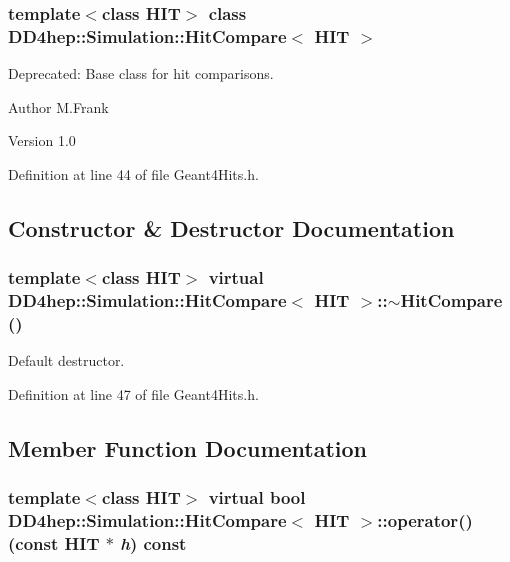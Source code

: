 \subsubsection*{template$<$class HIT$>$ class DD4hep::Simulation::HitCompare$<$ HIT $>$}

Deprecated: Base class for hit comparisons. \begin{DoxyAuthor}{Author}
M.Frank 
\end{DoxyAuthor}
\begin{DoxyVersion}{Version}
1.0 
\end{DoxyVersion}


Definition at line 44 of file Geant4Hits.h.

\subsection{Constructor \& Destructor Documentation}
\hypertarget{class_d_d4hep_1_1_simulation_1_1_hit_compare_a33e13448c6cda44f7d56a13e414635b3}{
\subsubsection[{$\sim$HitCompare}]{\setlength{\rightskip}{0pt plus 5cm}template$<$class HIT$>$ virtual {\bf DD4hep::Simulation::HitCompare}$<$ HIT $>$::$\sim${\bf HitCompare} ()}}
\label{class_d_d4hep_1_1_simulation_1_1_hit_compare_a33e13448c6cda44f7d56a13e414635b3}


Default destructor. 

Definition at line 47 of file Geant4Hits.h.

\subsection{Member Function Documentation}
\hypertarget{class_d_d4hep_1_1_simulation_1_1_hit_compare_a025eaffc34d0aad36988120c7d158ec7}{
\subsubsection[{operator()}]{\setlength{\rightskip}{0pt plus 5cm}template$<$class HIT$>$ virtual bool {\bf DD4hep::Simulation::HitCompare}$<$ HIT $>$::operator() (const HIT $\ast$ {\em h}) const}}
\label{class_d_d4hep_1_1_simulation_1_1_hit_compare_a025eaffc34d0aad36988120c7d158ec7}



